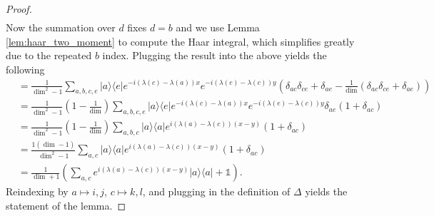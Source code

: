 \documentclass{article}
\newcommand{\ketbra}[2]{| #1\rangle\! \langle #2|}
\newcommand{\parens}[1]{\left( #1 \right)}
\newcommand{\identity}{\mathds{1}}
\begin{document}
\begin{proof}
\begin{align}
    \end{align}
    Now the summation over $d$ fixes $d=b$ and we use Lemma \ref{lem:haar_two_moment} to compute the Haar integral, which simplifies greatly due to the repeated $b$ index. Plugging the result into the above yields the following
    \begin{align}
        &= \frac{1}{\dim^2 - 1} \sum_{a, b, c, e} \ketbra{a}{e} e^{-i (\lambda(c) - \lambda(a))x} e^{-i (\lambda(e) - \lambda(c))y} \parens{\delta_{ac} \delta_{ce} + \delta_{ae} - \frac{1}{\dim} \parens{\delta_{ac} \delta_{ce} + \delta_{ae}}}  \\
        &= \frac{1}{\dim^2 - 1} \parens{1 - \frac{1}{\dim}} \sum_{a, b, c, e} \ketbra{a}{e} e^{-i (\lambda(c) - \lambda(a))x} e^{-i (\lambda(e) - \lambda(c))y} \delta_{ae} (1 + \delta_{ac}) \\
        &= \frac{1}{\dim^2 - 1} \parens{1 - \frac{1}{\dim}} \sum_{a, b, c} \ketbra{a}{a} e^{i (\lambda(a) - \lambda(c))(x-y)} (1 + \delta_{ac}) \\
        &= \frac{1 \parens{\dim - 1}}{\dim^2 - 1} \sum_{a,c} \ketbra{a}{a} e^{i (\lambda(a) - \lambda(c))(x - y)} (1 + \delta_{ac}) \\
        &= \frac{1}{\dim + 1} \parens{\sum_{a,c} e^{i (\lambda(a) - \lambda(c))(x-y)} \ketbra{a}{a} + \identity}.
    \end{align}
    Reindexing by $a \mapsto i,j$, $c \mapsto k,l$, and plugging in the definition of $\Delta$ yields the statement of the lemma.
\end{proof}
\end{document}
